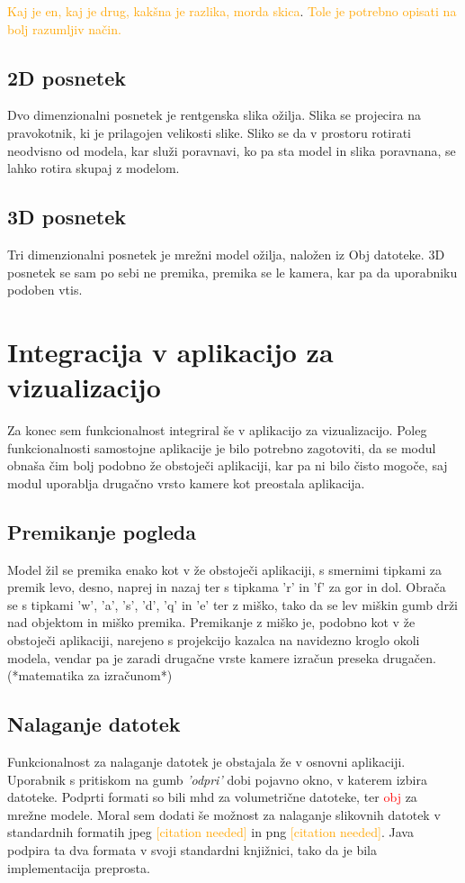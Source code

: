 \documentclass[a4paper, 12pt]{book}
\begin{document}
 \textcolor{orange}{Kaj je en, kaj je drug, kakšna je razlika, morda skica}.
\textcolor{orange}{Tole je potrebno opisati na bolj razumljiv način.}

\subsection*{2D posnetek}

Dvo dimenzionalni posnetek je rentgenska slika ožilja. Slika se projecira na pravokotnik, ki je prilagojen velikosti slike. Sliko se da v prostoru rotirati neodvisno od modela, kar služi poravnavi, ko pa sta model in slika poravnana, se lahko rotira skupaj z modelom.

\subsection*{3D posnetek}

Tri dimenzionalni posnetek je mrežni model ožilja, naložen iz Obj datoteke. 3D posnetek se sam po sebi ne premika, premika se le kamera, kar pa da uporabniku podoben vtis.

\section{Integracija v aplikacijo za vizualizacijo}

Za konec sem funkcionalnost integriral še v aplikacijo za vizualizacijo. Poleg funkcionalnosti samostojne aplikacije je bilo potrebno zagotoviti, da se modul obnaša čim bolj podobno že obstoječi aplikaciji, kar pa ni bilo čisto mogoče, saj modul uporablja drugačno vrsto kamere kot preostala aplikacija. 

\subsection*{Premikanje pogleda}

Model žil se premika enako kot v že obstoječi aplikaciji, s smernimi tipkami za premik levo, desno, naprej in nazaj ter s tipkama 'r' in 'f' za gor in dol. Obrača se s tipkami 'w', 'a', 's', 'd', 'q' in 'e' ter z miško, tako da se lev miškin gumb drži nad objektom in miško premika. Premikanje z miško je, podobno kot v že obstoječi aplikaciji, narejeno s projekcijo kazalca na navidezno kroglo okoli modela, vendar pa je zaradi drugačne vrste kamere izračun preseka drugačen. (*matematika za izračunom*) 


\subsection*{Nalaganje datotek}
Funkcionalnost za nalaganje datotek je obstajala že v osnovni aplikaciji. Uporabnik s pritiskom na gumb \emph{'odpri'} dobi pojavno okno, v katerem izbira datoteke. Podprti formati so bili mhd za volumetrične datoteke, ter \textcolor{red}{obj }za mrežne modele. Moral sem dodati še možnost za nalaganje slikovnih datotek v standardnih formatih jpeg \textcolor{orange}{[citation needed]} in png \textcolor{orange}{[citation needed]}. Java podpira ta dva formata v svoji standardni knjižnici, tako da je bila implementacija preprosta.
\end{document}

